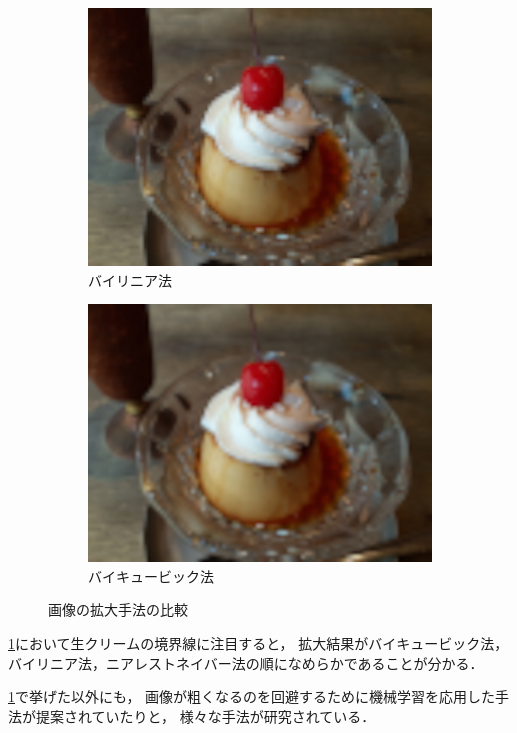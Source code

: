\documentclass[../../index]{subfiles}
\begin{document}
\begin{figure}[htbp]
\begin{subfigure}{0.5\linewidth}
    \includegraphics[width=\smallfiguresize]{linear.jpeg}
    \caption{バイリニア法}
  \end{subfigure}%
  \begin{subfigure}{0.5\linewidth}
    \centering
    \includegraphics[width=\smallfiguresize]{bicubic.jpeg}
    \caption{バイキュービック法}
  \end{subfigure}
  \caption{画像の拡大手法の比較}
  \label{figure:image_scaling_comparison}
\end{figure}

\cref{figure:image_scaling_comparison}において生クリームの境界線に注目すると，
拡大結果がバイキュービック法，バイリニア法，ニアレストネイバー法の順になめらかであることが分かる．

\cref{figure:image_scaling_comparison}で挙げた以外にも，
画像が粗くなるのを回避するために機械学習を応用した手法が提案されていたりと\cite{dong2014}，
様々な手法が研究されている．
\end{document}
